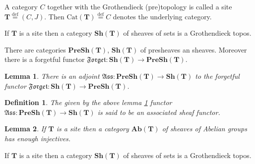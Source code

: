 \documentclass{beamer}
\theoremstyle{plain}
\newtheorem{defn}{Definition}
\newtheorem{lem}{Lemma}%
\newcommand{\bydef}{\stackrel{\mathrm{def}}{=}}
\begin{document}
\begin{frame}
	
	\begin{definition}
	A category $C$  together with 
the Grothendieck  (pre)topology is called a \alert{site} $\mathbf T\bydef \left(  C, J\right)$. Then $\mathrm{Cat}\left( \mathbf T\right)\bydef  C$ denotes the underlying category. 
	\end{definition}
	
	
	\begin{definition}
	If $\mathbf T$ is a site then  a category  $\mathbf{Sh}\left( \mathbf T \right)$ of sheaves of sets is a \alert{Grothendieck topos}.
\end{definition}
	\begin{definition}\label{forget_sheaf_defn}
	There are categories $\mathbf{PreSh}\left(\mathbf T \right)$, $ \mathbf{Sh}\left(\mathbf T\right)$ of presheaves an sheaves. Moreover there is a \alert{forgetful functor} $\mathfrak{Forget} : \mathbf{Sh}\left(\mathbf T \right)\to \mathbf{PreSh}\left(\mathbf T \right)$.
\end{definition}


\end{frame}
\begin{frame}
	\begin{lem}\label{associated_sheaf_stmnt}
	There is an adjoint $\mathfrak{Ass} : \mathbf{PreSh}\left(\mathbf T  \right)\to \mathbf{Sh}\left(\mathbf T \right)$ to the  forgetful functor $\mathfrak{Forget} : \mathbf{Sh}\left(\mathbf T  \right)\to \mathbf{PreSh}\left(\mathbf T \right)$.
\end{lem}	
	\begin{defn}\label{associated_sheaf_defn}
	The given by the above lemma  \ref{associated_sheaf_stmnt} functor $\mathfrak{Ass} : \mathbf{PreSh}\left(\mathbf T  \right)\to \mathbf{Sh}\left(\mathbf T \right)$  is said to be an  \alert{associated sheaf functor}.
\end{defn}
\begin{lem}\label{site_enough_stmt}
	If $\mathbf T$ is a site then a category $\mathbf {Ab}\left(\mathbf T \right)$ of sheaves of Abelian groups has enough injectives.
\end{lem}
\begin{definition}\label{grothenidieck_topos_defn}
	If $\mathbf T$ is a site then  a category  $\mathbf{Sh}\left( \mathbf T \right)$ of sheaves of sets is a \alert{Grothendieck topos}.
\end{definition}

\end{frame}
\end{document}
